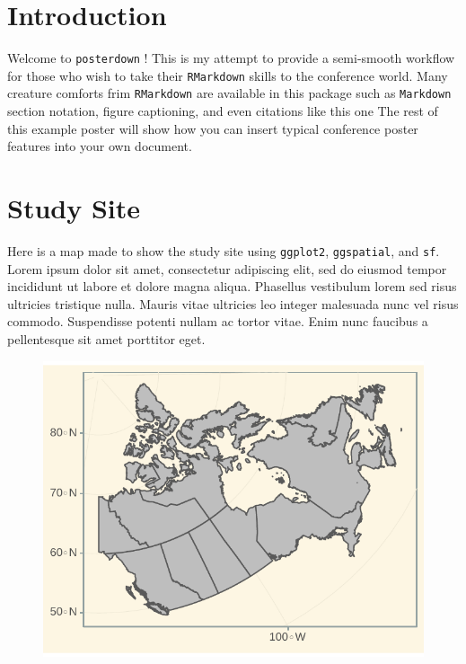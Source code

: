 \documentclass[article,30pt,extrafontsizes]{memoir}
\begin{document}
\color{black}
\begin{adjmulticols*}{3}{10mm}{10mm}
\normalsize{
\section{Introduction}\label{introduction}

Welcome to \texttt{posterdown} ! This is my attempt to provide a
semi-smooth workflow for those who wish to take their \texttt{RMarkdown}
skills to the conference world. Many creature comforts frim
\texttt{RMarkdown} are available in this package such as
\texttt{Markdown} section notation, figure captioning, and even
citations like this one \autocite{holden_identifying_2012} The rest of
this example poster will show how you can insert typical conference
poster features into your own document.

\section{Study Site}\label{study-site}

Here is a map made to show the study site using \texttt{ggplot2},
\texttt{ggspatial}, and \texttt{sf}. Lorem ipsum dolor sit amet,
\autocite{middleton_geological_nodate} consectetur adipiscing elit, sed
do eiusmod tempor incididunt ut labore et dolore magna aliqua. Phasellus
vestibulum lorem sed risus ultricies tristique nulla. Mauris vitae
ultricies leo integer malesuada nunc vel risus commodo. Suspendisse
potenti nullam ac tortor vitae. Enim nunc faucibus a pellentesque sit
amet porttitor eget. \vspace{15mm}

\begin{figure}

{\centering \includegraphics[width=0.8\linewidth]{skeleton_files/figure-latex/unnamed-chunk-2-1} 

}
\end{figure}}
\end{adjmulticols*}
\end{document}
